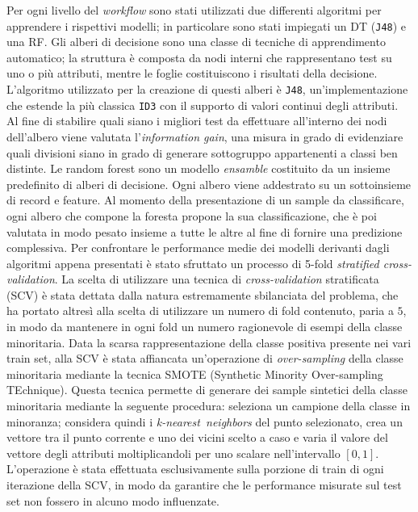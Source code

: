 Per ogni livello del \textit{workflow} sono stati utilizzati due differenti algoritmi per apprendere i rispettivi modelli; in particolare sono stati impiegati un DT (\texttt{J48}) e una RF.
Gli alberi di decisione sono una classe di tecniche di apprendimento automatico; la struttura è composta da nodi interni che rappresentano test su uno o più attributi, mentre le foglie costituiscono i risultati della decisione. L'algoritmo utilizzato per la creazione di questi alberi è \texttt{J48}, un'implementazione che estende la più classica \texttt{ID3} con il supporto di valori continui degli attributi. Al fine di stabilire quali siano i migliori test da effettuare all'interno dei nodi dell'albero viene valutata l'\textit{information gain}, una misura in grado di evidenziare quali divisioni siano in grado di generare sottogruppo appartenenti a classi ben distinte.
Le random forest sono un modello \textit{ensamble} costituito da un insieme predefinito di alberi di decisione. Ogni albero viene addestrato su un sottoinsieme di record e feature. Al momento della presentazione di un sample da classificare, ogni albero che compone la foresta propone la sua classificazione, che è poi valutata in modo pesato insieme a tutte le altre al fine di fornire una predizione complessiva.
Per confrontare le performance medie dei modelli derivanti dagli algoritmi appena presentati è stato sfruttato un processo di 5-fold \textit{stratified cross-validation}.
La scelta di utilizzare una tecnica di \textit{cross-validation} stratificata (SCV) è stata dettata dalla natura estremamente sbilanciata del problema, che ha portato altresì alla scelta di utilizzare un numero di fold contenuto, paria a $5$, in modo da mantenere in ogni fold un numero ragionevole di esempi della classe minoritaria.
Data la scarsa rappresentazione della classe positiva presente nei vari train set, alla SCV è stata affiancata un'operazione di \textit{over-sampling} della classe minoritaria mediante la tecnica SMOTE (Synthetic Minority Over-sampling TEchnique). 
Questa tecnica permette di generare dei sample sintetici della classe minoritaria mediante la seguente procedura: seleziona un campione della classe in minoranza; considera quindi i \textit{k-nearest neighbors} del punto selezionato, crea un vettore tra il punto corrente e uno dei vicini scelto a caso e varia il valore del vettore degli attributi moltiplicandoli per uno scalare nell'intervallo $[0, 1]$.
L'operazione è stata effettuata esclusivamente sulla porzione di train di ogni iterazione della SCV, in modo da garantire che le performance misurate sul test set non fossero in alcuno modo influenzate.
